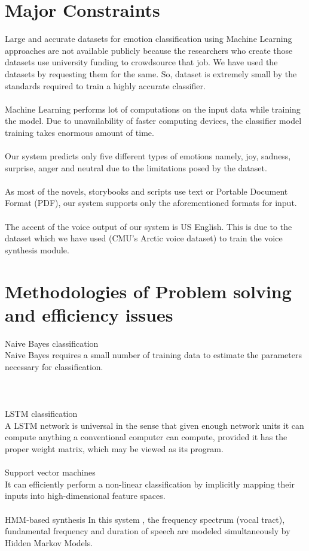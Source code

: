 \documentclass[oneside,a4paper,12pt]{book}
\begin{document}
\section{Major Constraints}
 Large and accurate datasets for emotion classification using Machine Learning approaches are not available publicly because the researchers who create those datasets use university funding to crowdsource that job. We have used the datasets by requesting them for the same. So, dataset is extremely small by the standards required to train a highly accurate classifier.\\\\
 Machine Learning performs lot of computations on the input data while training the model. Due to unavailability of faster computing devices, the classifier model training takes enormous amount of time.\\\\
 Our system predicts only five different types of emotions namely, joy, sadness, surprise, anger and neutral due to the limitations posed by the dataset.\\\\
 As most of the novels, storybooks and scripts use text or Portable Document Format (PDF), our system supports only the aforementioned formats for input.\\\\
 The accent of the voice output of our system is US English. This is due to the dataset which we have used (CMU's Arctic voice dataset) to train the voice synthesis module.
 
\section{Methodologies of Problem solving and efficiency issues}
 Naive Bayes classification\\
 Naive Bayes requires a small number of training data to estimate the parameters necessary for classification.\\\\\\\\
LSTM classification\\ A LSTM network is universal in the sense that given enough network units it can compute anything a conventional computer can compute, provided it has the proper weight matrix, which may be viewed as its program.\\\\
Support vector machines\\ It can efficiently perform a non-linear classification by implicitly mapping their inputs into high-dimensional feature spaces.\\\\
HMM-based synthesis In this system , the frequency spectrum (vocal tract), fundamental frequency and duration of speech are modeled simultaneously by Hidden Markov Models.
\end{document}
